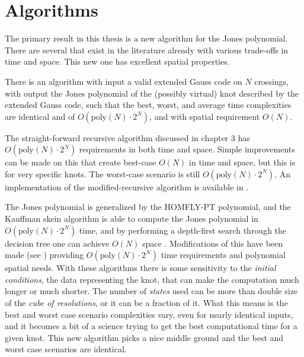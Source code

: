 \section{Algorithms}
    The primary result in this thesis is a new algorithm for the Jones
    polynomial. There are several that exist in the literature already with
    various trade-offs in time and space. This new one has excellent spatial
    properties.
    \begin{theorem}
        There is an algorithm with input a valid extended Gauss code on $N$
        crossings, with output the Jones polynomial of the (possibly virtual)
        knot described by the extended Gauss code, such that the best, worst,
        and average time complexities are identical and of
        $O(\textrm{poly}(N)\cdot{2}^{N})$, and with spatial requirement $O(N)$.
    \end{theorem}
    The straight-forward recursive algorithm discussed in chapter 3 has
    $O(\textrm{poly}(N)\cdot{2}^{N})$ requirements in both time and space.
    Simple improvements can be made on this that create best-case $O(N)$ in
    time and space, but this is for very specific knots. The worst-case scenario
    is still $O(\textrm{poly}(N)\cdot{2}^{N})$. An implementation of the
    modified-recursive algorithm is available in \cite{sage}.
    \par\hfill\par
    The Jones polynomial is generalized by the HOMFLY-PT polynomial, and the
    Kauffman skein algorithm is able to compute the Jones polynomial in
    $O(\textrm{poly}(N)\cdot{2}^{N})$ time, and by performing a depth-first
    search through the decision tree one can achieve $O(N)$ space
    \cite{Burton2018HOMFLFixedParameter}. Modifications of this have been made
    (see \cite{GouesbetHOMFLYAlgorithm}) providing
    $O(\textrm{poly}(N)\cdot{2}^{N})$ time requirements and polynomial
    spatial needs. With these algorithms there is some sensitivity to the
    \textit{initial conditions}, the data representing the knot, that can
    make the computation much longer or much shorter. The number of
    \textit{states} used can be more than double size of the
    \textit{cube of resolutions}, or it can be a fraction of it. What this
    means is the best and worst case scenario complexities vary, even for
    nearly identical inputs, and it becomes a bit of a science trying to get the
    best computational time for a given knot. This new algorithm picks a nice
    middle ground and the best and worst case scenarios are identical.
    \par\hfill\par
